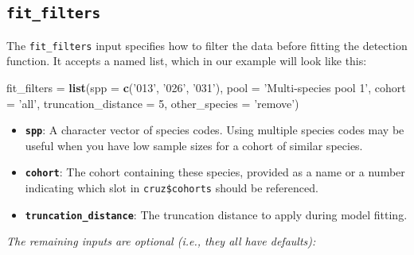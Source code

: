 \documentclass[
]{book}
\newenvironment{Shaded}{\begin{snugshade}}{\end{snugshade}}
\newcommand{\DataTypeTok}[1]{\textcolor[rgb]{0.13,0.29,0.53}{#1}}
\newcommand{\DecValTok}[1]{\textcolor[rgb]{0.00,0.00,0.81}{#1}}
\newcommand{\KeywordTok}[1]{\textcolor[rgb]{0.13,0.29,0.53}{\textbf{#1}}}
\newcommand{\NormalTok}[1]{#1}
\newcommand{\StringTok}[1]{\textcolor[rgb]{0.31,0.60,0.02}{#1}}
\begin{document}
\hypertarget{fit_filters}{%
\subsection*{\texorpdfstring{\texttt{fit\_filters}}{fit\_filters}}\label{fit_filters}}

The \texttt{fit\_filters} input specifies how to filter the data before fitting the detection function. It accepts a named list, which in our example will look like this:

\begin{Shaded}
\begin{Highlighting}[]
\NormalTok{fit_filters =}\StringTok{ }\KeywordTok{list}\NormalTok{(}\DataTypeTok{spp =} \KeywordTok{c}\NormalTok{(}\StringTok{'013'}\NormalTok{, }\StringTok{'026'}\NormalTok{, }\StringTok{'031'}\NormalTok{), }
                   \DataTypeTok{pool =} \StringTok{'Multi-species pool 1'}\NormalTok{,}
                   \DataTypeTok{cohort =} \StringTok{'all'}\NormalTok{,}
                   \DataTypeTok{truncation_distance =} \DecValTok{5}\NormalTok{,}
                   \DataTypeTok{other_species =} \StringTok{'remove'}\NormalTok{)}
\end{Highlighting}
\end{Shaded}

\begin{itemize}
\item
  \textbf{\texttt{spp}}: A character vector of species codes. Using multiple species codes may be useful when you have low sample sizes for a cohort of similar species.
\item
  \textbf{\texttt{cohort}}: The cohort containing these species, provided as a name or a number indicating which slot in \texttt{cruz\$cohorts} should be referenced.
\item
  \textbf{\texttt{truncation\_distance}}: The truncation distance to apply during model fitting.
\end{itemize}

\emph{The remaining inputs are optional (i.e., they all have defaults):}
\end{document}
